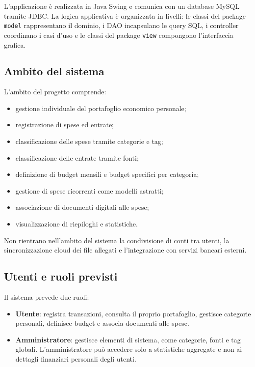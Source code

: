\documentclass[11pt,a4paper]{article}
\begin{document}
L'applicazione è realizzata in Java Swing e comunica con un database MySQL tramite JDBC. La logica applicativa è organizzata in livelli: le classi del package \texttt{model} rappresentano il dominio, i DAO incapsulano le query SQL, i controller coordinano i casi d'uso e le classi del package \texttt{view} compongono l'interfaccia grafica.

\subsection{Ambito del sistema}
L'ambito del progetto comprende:
\begin{itemize}
    \item gestione individuale del portafoglio economico personale;
    \item registrazione di spese ed entrate;
    \item classificazione delle spese tramite categorie e tag;
    \item classificazione delle entrate tramite fonti;
    \item definizione di budget mensili e budget specifici per categoria;
    \item gestione di spese ricorrenti come modelli astratti;
    \item associazione di documenti digitali alle spese;
    \item visualizzazione di riepiloghi e statistiche.
\end{itemize}
Non rientrano nell'ambito del sistema la condivisione di conti tra utenti, la sincronizzazione cloud dei file allegati e l'integrazione con servizi bancari esterni.

\subsection{Utenti e ruoli previsti}
Il sistema prevede due ruoli:
\begin{itemize}
    \item \textbf{Utente}: registra transazioni, consulta il proprio portafoglio, gestisce categorie personali, definisce budget e associa documenti alle spese.
    \item \textbf{Amministratore}: gestisce elementi di sistema, come categorie, fonti e tag globali. L'amministratore può accedere solo a statistiche aggregate e non ai dettagli finanziari personali degli utenti.
\end{itemize}
\end{document}
